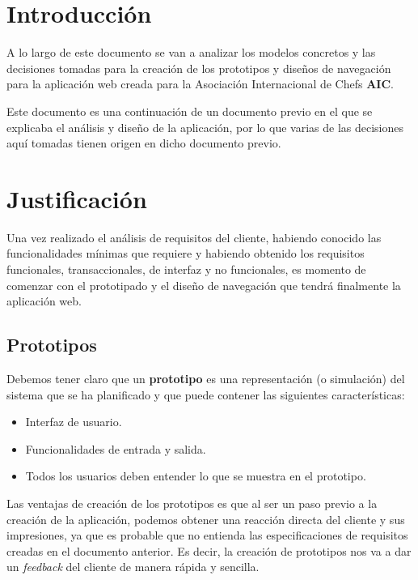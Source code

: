 \documentclass{\ClassPath/viu-tfm-template}
\begin{document}
    \graphicspath{{../../VIU_TFM_LaTeX_template/}}

    \coverpage

    \tableofcontents

\chapter{Introducción}
A lo largo de este documento se van a analizar los modelos concretos y las decisiones tomadas para la creación de los prototipos y diseños de navegación para la aplicación web creada para la Asociación Internacional de Chefs \textbf{AIC}.

Este documento es una continuación de un documento previo en el que se explicaba el análisis y diseño de la aplicación, por lo que varias de las decisiones aquí tomadas tienen origen en dicho documento previo.


\chapter{Justificación}
Una vez realizado el análisis de requisitos del cliente, habiendo conocido las funcionalidades mínimas que requiere y habiendo obtenido los requisitos funcionales, transaccionales, de interfaz y no funcionales, es momento de comenzar con el prototipado y el diseño de navegación que tendrá finalmente la aplicación web.

\section{Prototipos}
Debemos tener claro que un \textbf{prototipo} es una representación (o simulación) del sistema que se ha planificado y que puede contener las siguientes características:

\begin{itemize}
    \item Interfaz de usuario.
    \item Funcionalidades de entrada y salida.
    \item Todos los usuarios deben entender lo que se muestra en el prototipo.
\end{itemize}

Las ventajas de creación de los prototipos es que al ser un paso previo a la creación de la aplicación, podemos obtener una reacción directa del cliente y sus impresiones, ya que es probable que no entienda las especificaciones de requisitos creadas en el documento anterior. Es decir, la creación de prototipos nos va a dar un \textit{feedback} del cliente de manera rápida y sencilla.
\end{document}
